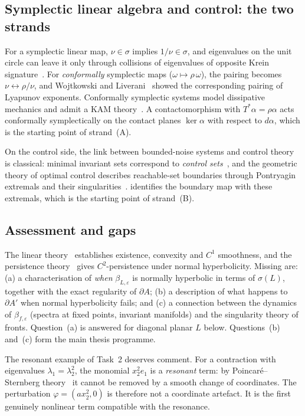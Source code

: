 \documentclass[11pt,a4paper]{article}
\theoremstyle{definition}
\theoremstyle{remark}
\newcommand{\eps}{\varepsilon}
\begin{document}
\subsection{Symplectic linear algebra and control: the two strands}
For a symplectic linear map, $\nu\in\sigma$ implies $1/\nu\in\sigma$, and eigenvalues on the unit circle can leave it
only through collisions of eigenvalues of opposite Krein signature~\cite{MS17}. For \emph{conformally} symplectic maps ($\omega\mapsto\rho\,\omega$), the
pairing becomes $\nu\leftrightarrow\rho/\nu$, and Wojtkowski and Liverani~\cite{WL98} showed the corresponding pairing of
Lyapunov exponents. Conformally symplectic systems model dissipative mechanics and admit a KAM theory~\cite{CCdlL13}. A
contactomorphism with $T^*\alpha=\rho\alpha$ acts conformally symplectically on the contact planes $\ker\alpha$ with
respect to $d\alpha$, which is the starting point of strand~(A).

On the control side, the link between bounded-noise systems and control theory is classical: minimal invariant sets
correspond to \emph{control sets}~\cite{CK00}, and the geometric theory of optimal control describes reachable-set
boundaries through Pontryagin extremals and their singularities~\cite{PBGM62,AS04}.  identifies the
boundary map with these extremals, which is the starting point of strand~(B).

\subsection{Assessment and gaps}
The linear theory~\cite{LRT23} establishes existence, convexity and $C^1$ smoothness, and the persistence
theory~\cite{KLRTTT23} gives $C^2$-persistence under normal hyperbolicity. Missing are: (a) a characterisation of
\emph{when} $\beta_{L,\eps}$ is normally hyperbolic in terms of $\sigma(L)$, together with the exact regularity of
$\partial A$; (b) a description of what happens to $\partial A'$ when normal hyperbolicity fails; and (c) a connection
between the dynamics of $\beta_{f,\eps}$ (spectra at fixed points, invariant manifolds) and the singularity theory of
fronts. Question~(a) is answered for diagonal planar $L$ below. Questions~(b) and~(c) form the main thesis programme.

The resonant example of Task~2 deserves comment. For a contraction with eigenvalues $\lambda_1=\lambda_2^2$, the
monomial $x_2^2e_1$ is a \emph{resonant} term: by Poincar\'e--Sternberg theory~\cite{Ste57} it cannot be removed by a
smooth change of coordinates. The perturbation $\varphi=(ax_2^2,0)$ is therefore not a coordinate artefact. It is the
first genuinely nonlinear term compatible with the resonance.
\end{document}
